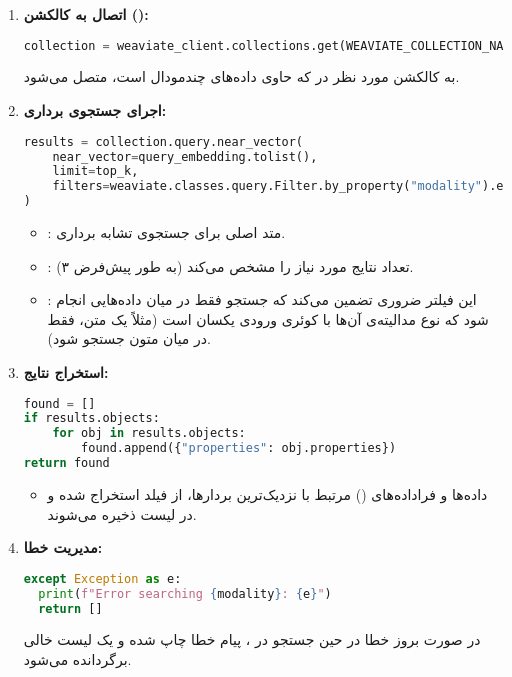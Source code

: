 \documentclass{article}
\begin{document}
\begin{enumerate}
    \item \textbf{اتصال به کالکشن ():}
        \begin{latin}
        \begin{lstlisting}[language=Python]
collection = weaviate_client.collections.get(WEAVIATE_COLLECTION_NAME)
        \end{lstlisting}
        \end{latin}
        به کالکشن مورد نظر در  که حاوی داده‌های چندمودال است، متصل می‌شود.

    \item \textbf{اجرای جستجوی برداری:}
        \begin{latin}
        \begin{lstlisting}[language=Python]
results = collection.query.near_vector(
    near_vector=query_embedding.tolist(),
    limit=top_k,
    filters=weaviate.classes.query.Filter.by_property("modality").equal(modality),
)
        \end{lstlisting}
        \end{latin}
        \begin{itemize}
            \item {}: متد اصلی برای جستجوی تشابه برداری.
            \item {}: تعداد نتایج مورد نیاز را مشخص می‌کند (به طور پیش‌فرض ۳).
            \item {}: این فیلتر ضروری تضمین می‌کند که جستجو فقط در میان داده‌هایی انجام شود که نوع مدالیته‌ی آن‌ها با کوئری ورودی یکسان است (مثلاً  یک متن، فقط در میان  متون جستجو شود).
        \end{itemize}

    \item \textbf{استخراج نتایج:}
        \begin{latin}
        \begin{lstlisting}[language=Python]
found = []
if results.objects:
    for obj in results.objects:
        found.append({"properties": obj.properties})
return found
        \end{lstlisting}
        \end{latin}
        \begin{itemize}
            \item داده‌ها و فراداده‌های () مرتبط با نزدیک‌ترین بردارها، از فیلد  استخراج شده و در لیست  ذخیره می‌شوند.
        \end{itemize}

    \item \textbf{مدیریت خطا:}
        \begin{latin}
        \begin{lstlisting}[language=Python]
except Exception as e:
  print(f"Error searching {modality}: {e}")
  return []
        \end{lstlisting}
        \end{latin}
        در صورت بروز خطا در حین جستجو در ، پیام خطا چاپ شده و یک لیست خالی برگردانده می‌شود.
\end{enumerate}
\end{document}

